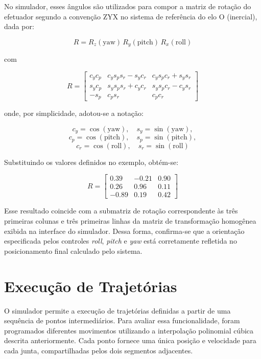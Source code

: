 No simulador, esses ângulos são utilizados para compor a matriz de rotação do efetuador segundo a convenção ZYX no sistema de referência do elo O (inercial), dada por:

\begin{equation}
R = R_z(\text{yaw})\,R_y(\text{pitch})\,R_x(\text{roll})
\end{equation}

com

\begin{equation}
R =
\begin{bmatrix}
c_y c_p & c_y s_p s_r - s_y c_r & c_y s_p c_r + s_y s_r \\
s_y c_p & s_y s_p s_r + c_y c_r & s_y s_p c_r - c_y s_r \\
-s_p    & c_p s_r               & c_p c_r
\end{bmatrix}
\end{equation}

onde, por simplicidade, adotou-se a notação:

\[
c_y = \cos(\text{yaw}), \quad s_y = \sin(\text{yaw}),
\]
\[
c_p = \cos(\text{pitch}), \quad s_p = \sin(\text{pitch}),
\]
\[
c_r = \cos(\text{roll}), \quad s_r = \sin(\text{roll})
\]

Substituindo os valores definidos no exemplo, obtém-se:

\begin{equation}
R =
\begin{bmatrix}
0.39 & -0.21 & 0.90 \\
0.26 & 0.96 & 0.11 \\
-0.89 & 0.19 & 0.42
\end{bmatrix}
\end{equation}

Esse resultado coincide com a submatriz de rotação correspondente às três primeiras colunas e três primeiras linhas da matriz de transformação homogênea exibida na interface do simulador. Dessa forma, confirma-se que a orientação especificada pelos controles \textit{roll}, \textit{pitch} e \textit{yaw} está corretamente refletida no posicionamento final calculado pelo sistema.

\section{Execução de Trajetórias}

O simulador permite a execução de trajetórias definidas a partir de uma sequência de pontos intermediários. Para avaliar essa funcionalidade, foram programados diferentes movimentos utilizando a interpolação polinomial cúbica descrita anteriormente. Cada ponto fornece uma única posição e velocidade para cada junta, compartilhadas pelos dois segmentos adjacentes.

